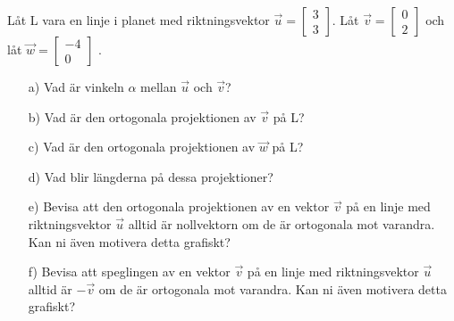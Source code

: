 Låt L vara en linje i planet med riktningsvektor $\vec{u} = \begin{bmatrix} 3 \\ 3 \end{bmatrix}$. Låt $\vec{v} = \begin{bmatrix} 0 \\ 2 \end{bmatrix}$ och låt $\vec{w} = \begin{bmatrix} -4 \\ 0 \end{bmatrix}$ .
\begin{itemize}
\item[a) ] Vad är vinkeln $\alpha$ mellan $\vec{u}$ och $\vec{v}$?
\item[b) ] Vad är den ortogonala projektionen av $\vec{v}$ på L?
\item[c) ] Vad är den ortogonala projektionen av $\vec{w}$ på L?
\item[d) ] Vad blir längderna på dessa projektioner?
\item[e) ] Bevisa att den ortogonala projektionen av en vektor $\vec{v}$ på en linje med riktningsvektor $\vec{u}$ alltid är nollvektorn om de är ortogonala mot varandra. Kan ni även motivera detta grafiskt? 
\item[f) ] Bevisa att speglingen av en vektor $\vec{v}$ på en linje med riktningsvektor $\vec{u}$ alltid är $-\vec{v}$ om de är ortogonala mot varandra. Kan ni även motivera detta grafiskt?
\end{itemize}   